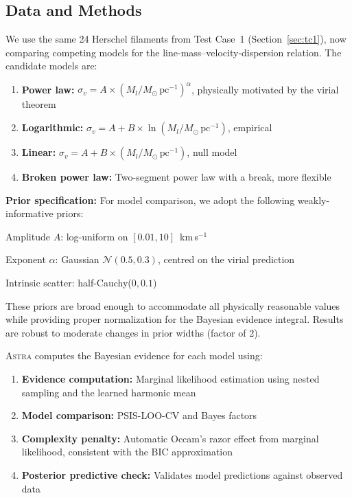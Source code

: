 \documentclass[usenatbib]{rasti}
\newcommand{\astra}{\textsc{Astra}\xspace}
\begin{document}
\subsection{Data and Methods}
\label{sec:tc5:data}

We use the same 24 Herschel filaments from Test Case~1 (Section~\ref{sec:tc1}), now comparing competing models for the line-mass--velocity-dispersion relation.
The candidate models are:
\begin{enumerate}
  \item[(i)] \textbf{Power law:} $\sigma_v = A \times (M_l/M_\odot\,\mathrm{pc}^{-1})^{\alpha}$, physically motivated by the virial theorem
  \item[(ii)] \textbf{Logarithmic:} $\sigma_v = A + B \times \ln(M_l/M_\odot\,\mathrm{pc}^{-1})$, empirical
  \item[(iii)] \textbf{Linear:} $\sigma_v = A + B \times (M_l/M_\odot\,\mathrm{pc}^{-1})$, null model
  \item[(iv)] \textbf{Broken power law:} Two-segment power law with a break, more flexible
\end{enumerate}

\textbf{Prior specification:}
For model comparison, we adopt the following weakly-informative priors:
\begin{description}
  \item Amplitude $A$: log-uniform on $[0.01, 10]$~km\,s$^{-1}$
  \item Exponent $\alpha$: Gaussian $\mathcal{N}(0.5, 0.3)$, centred on the virial prediction
  \item Intrinsic scatter: half-Cauchy($0, 0.1$)
\end{description}
These priors are broad enough to accommodate all physically reasonable values while providing proper normalization for the Bayesian evidence integral.
Results are robust to moderate changes in prior widths (factor of 2).

\astra computes the Bayesian evidence for each model using:
\begin{enumerate}
  \item[(i)] \textbf{Evidence computation:} Marginal likelihood estimation using nested sampling and the learned harmonic mean \citep{SpurioMancini+2023}
  \item[(ii)] \textbf{Model comparison:} PSIS-LOO-CV and Bayes factors \citep{Eadie+2023}
  \item[(iii)] \textbf{Complexity penalty:} Automatic Occam's razor effect from marginal likelihood, consistent with the BIC approximation \citep{Schwarz1978}
  \item[(iv)] \textbf{Posterior predictive check:} Validates model predictions against observed data
\end{enumerate}
\end{document}
